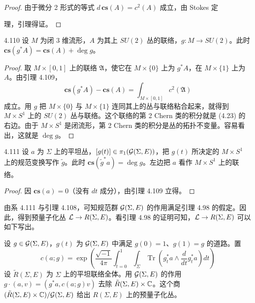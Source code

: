 \begin{proof}
  由于微分 2 形式的等式 $d\,\mathbf{cs}(A)=c^2(A)$ 成立，由 Stokes 定

  理，引理得证。
\end{proof}

\begin{lemma*}{4.110}
  设 $M$ 为闭 3 维流形，$A$ 为其上 $SU(2)$ 丛的联络，$g:M\to SU(2)$。此时 $\mathbf{cs}(g^*A)=\mathbf{cs}(A)+\deg g$。
\end{lemma*}

\begin{proof}
  取 $M\times[0,1]$ 上的联络 $\mathfrak{A}$，使它在 $M\times\{0\}$ 上为 $g^*A$，在 $M\times\{1\}$ 上为 $A$。由引理 4.109，
  \begin{equation}
    \mathbf{cs}(g^*A)-\mathbf{cs}(A)=\int_{M\times[0,1]}c^2(\mathfrak{A}) \tag{4.23}
  \end{equation}
  成立。用 $g$ 把 $M\times\{0\}$ 与 $M\times\{1\}$ 连同其上的丛与联络粘合起来，就得到 $M\times S^1$ 上的 $SU(2)$ 丛与联络。这个联络的第 2 Chern 类的积分就是 (4.23) 的右边。由于 $M\times S^1$ 是闭流形，第 2 Chern 类的积分是丛的拓扑不变量。容易看出，这就是 $\deg g$。
\end{proof}

\begin{corollary*}{4.111}
  设 $a$ 为 $\Sigma$ 上的平坦丛，$[g(t)]\in\pi_1(\mathcal{G}(\Sigma,E))$，把 $g(t)$ 所决定的 $M\times S^1$ 上的规范变换写作 $\tilde g$。此时 $\mathbf{cs}(\tilde g^*a)=\deg g$。左边把 $a$ 看作 $M\times S^1$ 上的联络。
\end{corollary*}

\begin{proof}
  因 $\mathbf{cs}(a)=0$（没有 $dt$ 成分），由引理 4.109 立得。
\end{proof}

由系 4.111 与引理 4.108，可知规范群 $\mathcal{G}(\Sigma,E)$ 的作用满足引理 4.98 的假定。因此，得到预量子化丛 $\mathcal{L}\to R(\Sigma,E)$。看引理 4.98 的证明可知，$\mathcal{L}\to R(\Sigma,E)$ 可以如下写出。

设 $g\in\mathcal{G}(\Sigma,E)$，$g(t)$ 为 $\mathcal{G}(\Sigma,E)$ 中满足 $g(0)=1$、$g(1)=g$ 的道路。置
\begin{equation}
  c(a;g)=\exp\left(\frac{\sqrt{-1}}{4\pi}\int_{t=0}^{1}\int_\Sigma\operatorname{Tr}\left(g_t^*a\wedge\frac{d}{dt}g_t^*a\right)dt\right) \tag{4.24}
\end{equation}
设 $\tilde R(\Sigma,E)$ 为 $\Sigma$ 上的平坦联络全体。用 $\mathcal{G}(\Sigma,E)$ 的作用 $g\cdot(a,v)=(g^*a,c(a;g)v)$ 去除 $\tilde R(\Sigma,E)\times\mathbb{C}$。这个商 $(\tilde R(\Sigma,E)\times\mathbb{C})/\mathcal{G}(\Sigma,E)$ 给出 $R(\Sigma,E)$ 上的预量子化丛。

